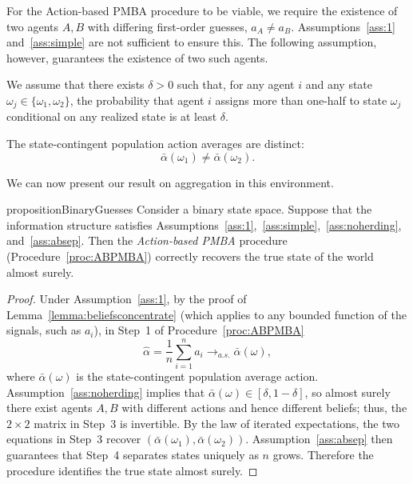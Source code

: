 \documentclass[12pt,reqno]{amsart}
\begin{document}
For the Action-based PMBA procedure to be viable, we require the existence of two agents $A,B$ with differing first-order guesses, $a_A \neq a_B$. Assumptions~\ref{ass:1} and~\ref{ass:simple} are not sufficient to ensure this. The following assumption, however, guarantees the existence of two such agents.


\begin{assumption}[No Herding]\label{ass:noherding}
We assume that there exists $\delta>0$ such that, for any agent $i$ and any state $\omega_j \in \{\omega_1,\omega_2\}$, the probability that agent $i$ assigns more than one-half to state $\omega_j$  conditional on any realized state is at least $\delta$.
\end{assumption}

\begin{assumption}\label{ass:absep}
The state-contingent population action averages are distinct:
\[
\bar\alpha(\omega_1)\neq \bar\alpha(\omega_2).
\]
\end{assumption}

We can now present our result on aggregation in this environment.

\begin{restatable}{proposition}{BinaryGuesses}\label{prop:BG}
Consider a binary state space. Suppose that the information structure satisfies Assumptions~\ref{ass:1},~\ref{ass:simple},~\ref{ass:noherding}, and~\ref{ass:absep}. Then the \emph{Action-based PMBA} procedure (Procedure~\ref{proc:ABPMBA}) correctly recovers the true state of the world almost surely.
\end{restatable}

\begin{proof}
Under Assumption~\ref{ass:1}, by the proof of Lemma~\ref{lemma:beliefsconcentrate} (which applies to any bounded function of the signals, such as $a_i$), in Step~1 of Procedure~\ref{proc:ABPMBA}
\[
\hat\alpha=\frac1n\sum_{i=1}^n a_i \to_{a.s.} \bar\alpha(\omega),
\]
where $\bar\alpha(\omega)$ is the state-contingent population average action. Assumption~\ref{ass:noherding} implies that $\bar\alpha(\omega)\in[\delta,1-\delta]$, so almost surely there exist agents $A,B$ with different actions and hence different beliefs; thus, the $2\times2$ matrix in Step~3 is invertible. By the law of iterated expectations, the two equations in Step~3 recover $(\bar\alpha(\omega_1),\bar\alpha(\omega_2))$. Assumption~\ref{ass:absep} then guarantees that Step~4 separates states uniquely as $n$ grows. Therefore the procedure identifies the true state almost surely.
\end{proof}
\end{document}
